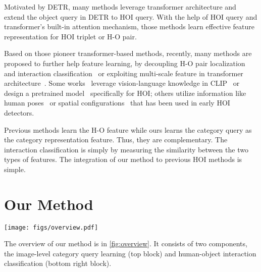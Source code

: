 \documentclass[10pt,twocolumn,letterpaper]{article}
\begin{document}
Motivated by DETR\cite{zou2021end}, many methods\cite{tamura2021qpic, zou2021end, kim2021hotr, chen2021reformulating} leverage transformer architecture\cite{vaswani2017attention} and extend the object query in DETR to HOI query. With the help of HOI query and transformer's built-in attention mechanism, those methods learn effective feature representation for HOI triplet or H-O pair.

Based on those pioneer transformer-based methods, recently, many methods are proposed to further help feature learning, by decoupling H-O pair localization and interaction classification~\cite{zhang2021mining, zhou2022disentangled, liao2022gen} or exploiting multi-scale feature in transformer architecture~\cite{kim2022mstr}. Some works~\cite{liao2022gen, dong2022catn} leverage vision-language knowledge in CLIP~\cite{radford2021CLIP} or design a pretrained model~\cite{yuan2022rlip} specifically for HOI; others utilize information like human poses~\cite{wu2022bodypartmap} or spatial configurations~\cite{iftekhar2022ssrt} that has been used in early HOI detectors.

 Previous methods learn the H-O feature while ours learns the category query as the category representation feature. Thus, they are complementary. The interaction classification is simply by measuring the similarity between the two types of features. The integration of our method to previous HOI methods is simple.

\section{Our Method}
\label{sec.method}

\begin{figure*}
  \centering
\texttt{[image: figs/overview.pdf]}
  \caption{Overview of our method.
  It consists of two components (top and bottom right). It can be integrated with any baseline HOI method (bottom left) that provides image feature  and human-object instance features . See \cref{sec.method} for details.
   }
  \vspace{-8pt}
  \label{fig:overview}
\end{figure*}

The overview of our method is in \cref{fig:overview}. It consists of two components, the image-level category query learning (top block) and human-object interaction classification (bottom right block).
\end{document}
